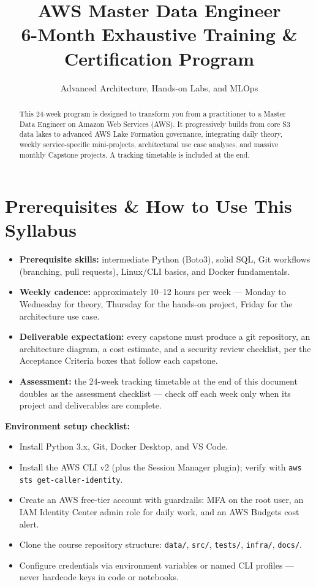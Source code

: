 \documentclass[11pt, a4paper]{article}
\title{\Huge \textbf{AWS Master Data Engineer}\\ \Large 6-Month Exhaustive Training \& Certification Program}
\author{Advanced Architecture, Hands-on Labs, and MLOps}
\date{}
\begin{document}
\maketitle

\begin{abstract}
\noindent This 24-week program is designed to transform you from a practitioner to a Master Data Engineer on Amazon Web Services (AWS). It progressively builds from core S3 data lakes to advanced AWS Lake Formation governance, integrating daily theory, weekly service-specific mini-projects, architectural use case analyses, and massive monthly Capstone projects. A tracking timetable is included at the end.
\end{abstract}

\tableofcontents
\newpage

\section*{Prerequisites \& How to Use This Syllabus}
\begin{itemize}[label=-]
    \item \textbf{Prerequisite skills:} intermediate Python (Boto3), solid SQL, Git workflows (branching, pull requests), Linux/CLI basics, and Docker fundamentals.
    \item \textbf{Weekly cadence:} approximately 10--12 hours per week --- Monday to Wednesday for theory, Thursday for the hands-on project, Friday for the architecture use case.
    \item \textbf{Deliverable expectation:} every capstone must produce a git repository, an architecture diagram, a cost estimate, and a security review checklist, per the Acceptance Criteria boxes that follow each capstone.
    \item \textbf{Assessment:} the 24-week tracking timetable at the end of this document doubles as the assessment checklist --- check off each week only when its project and deliverables are complete.
\end{itemize}

\noindent\textbf{Environment setup checklist:}
\begin{itemize}[label=-]
    \item Install Python 3.x, Git, Docker Desktop, and VS Code.
    \item Install the AWS CLI v2 (plus the Session Manager plugin); verify with \texttt{aws sts get-caller-identity}.
    \item Create an AWS free-tier account with guardrails: MFA on the root user, an IAM Identity Center admin role for daily work, and an AWS Budgets cost alert.
    \item Clone the course repository structure: \texttt{data/}, \texttt{src/}, \texttt{tests/}, \texttt{infra/}, \texttt{docs/}.
    \item Configure credentials via environment variables or named CLI profiles --- never hardcode keys in code or notebooks.
\end{itemize}
\end{document}
